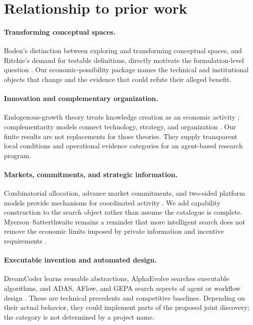 \documentclass[11pt,letterpaper]{article}
\theoremstyle{remark}\newtheorem{remark}{Remark}[section]
\begin{document}
\section{Relationship to prior work}
\paragraph{Transforming conceptual spaces.} Boden's distinction between exploring and transforming conceptual spaces, and Ritchie's demand for testable definitions, directly motivate the formulation-level question \citep{boden1998,ritchie2006}. Our economic-possibility package names the technical and institutional objects that change and the evidence that could refute their alleged benefit.
\paragraph{Innovation and complementary organization.} Endogenous-growth theory treats knowledge creation as an economic activity \citep{romer1990}; complementarity models connect technology, strategy, and organization \citep{milgrom1990}. Our finite results are not replacements for those theories. They supply transparent local conditions and operational evidence categories for an agent-based research program.
\paragraph{Markets, commitments, and strategic information.} Combinatorial allocation, advance market commitments, and two-sided platform models provide mechanisms for coordinated activity \citep{sandholm2002,kremer2020,rochet2003}. We add capability construction to the search object rather than assume the catalogue is complete. Myerson--Satterthwaite remains a reminder that more intelligent search does not remove the economic limits imposed by private information and incentive requirements \citep{myerson1983}.
\paragraph{Executable invention and automated design.} DreamCoder learns reusable abstractions, AlphaEvolve searches executable algorithms, and ADAS, AFlow, and GEPA search aspects of agent or workflow design \citep{ellis2020,novikov2025,hu2024,zhang2024,agrawal2025}. These are technical precedents and competitive baselines. Depending on their actual behavior, they could implement parts of the proposed joint discovery; the category is not determined by a project name.
\end{document}
